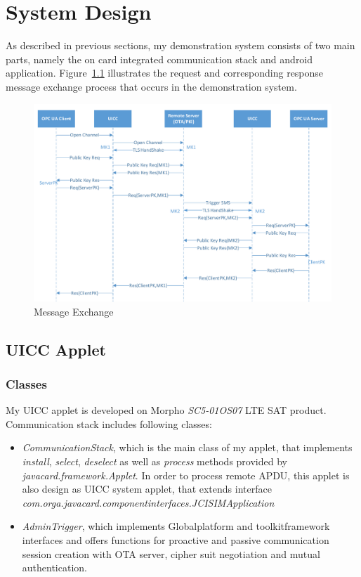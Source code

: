 \chapter{System Design}
As described in previous sections, my demonstration system consists of two main parts, namely the on card integrated  communication stack and android application. Figure~\ref{fig:whole-structure} illustrates the request and corresponding response message exchange  process that occurs in the demonstration system.

\begin{figure}[!htbp]
	\centering
	\includegraphics[width=1.0\textwidth]{whole-structure}
		\caption{Message Exchange}
	\label{fig:whole-structure}
\end{figure}

\section{UICC Applet}

\subsection{Classes}
My UICC applet is developed on Morpho \emph{SC5-01OS07} LTE SAT product.
Communication stack includes following classes:
 \begin{itemize}
  \item  \emph{CommunicationStack}, which is the main class of my applet, that implements \emph{install}, \emph{select}, \emph{deselect} as well as \emph{process} methods provided by \emph{javacard.framework.Applet}. In order to process remote APDU, this applet is also design as UICC system applet, that extends interface \emph{com.orga.javacard.componentinterfaces.JCISIMApplication}
  \item  \emph{AdminTrigger}, which implements Globalplatform  and toolkitframework interfaces and offers functions for proactive and passive communication session creation with OTA server, cipher suit negotiation and mutual authentication.
\end{itemize}

